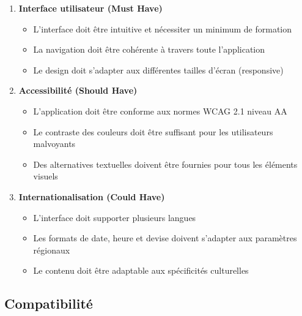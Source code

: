 \begin{enumerate}
    \item \textbf{Interface utilisateur (Must Have)}
    \begin{itemize}
        \item L'interface doit être intuitive et nécessiter un minimum de formation
        \item La navigation doit être cohérente à travers toute l'application
        \item Le design doit s'adapter aux différentes tailles d'écran (responsive)
    \end{itemize}
    
    \item \textbf{Accessibilité (Should Have)}
    \begin{itemize}
        \item L'application doit être conforme aux normes WCAG 2.1 niveau AA
        \item Le contraste des couleurs doit être suffisant pour les utilisateurs malvoyants
        \item Des alternatives textuelles doivent être fournies pour tous les éléments visuels
    \end{itemize}
    
    \item \textbf{Internationalisation (Could Have)}
    \begin{itemize}
        \item L'interface doit supporter plusieurs langues
        \item Les formats de date, heure et devise doivent s'adapter aux paramètres régionaux
        \item Le contenu doit être adaptable aux spécificités culturelles
    \end{itemize}
\end{enumerate}

\subsection{Compatibilité}

